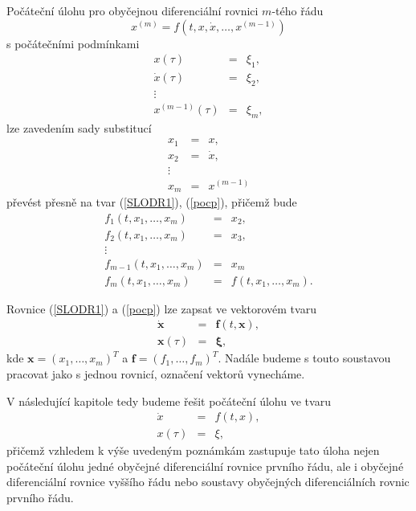 \documentclass[a4paper, 12pt]{book}
\theoremstyle{definition}
\def\vc#1{\mathbf{\boldsymbol{#1}}}     %
\begin{document}
Počáteční úlohu pro obyčejnou diferenciální rovnici $m$-tého řádu
\begin{equation}\label{LODRm}
x^{(m)}=f(t,x,\dot x,\dots,x^{(m-1)})
\end{equation}
s počátečními podmínkami
\begin{equation}\label{pocpm}
\begin{array}{rcl}
x(\tau)&=&\xi_1,\\
\dot x(\tau)&=&\xi_2,\\
\vdots\\
x^{(m-1)}(\tau)&=&\xi_m,
\end{array}
\end{equation}
lze zavedením sady substitucí
\begin{displaymath}
\begin{array}{rcl}
x_1&=&x,\\
x_2&=&\dot x,\\
\vdots\\
x_m&=&x^{(m-1)}
\end{array}
\end{displaymath}
převést přesně na tvar (\ref{SLODR1}), (\ref{pocp}), přičemž bude
\begin{displaymath}
\begin{array}{rcl}
f_1(t,x_1,\dots,x_m)&=&x_2,\\
f_2(t,x_1,\dots,x_m)&=&x_3,\\
\vdots\\
f_{m-1}(t,x_1,\dots,x_m)&=&x_m\\
f_m(t,x_1,\dots,x_m)&=&f(t,x_1,\dots,x_m).
\end{array}
\end{displaymath}

Rovnice (\ref{SLODR1}) a (\ref{pocp}) lze zapsat ve vektorovém tvaru
\begin{eqnarray*}
\dot{\vc x}&=&\vc f(t,\vc x),\\
\vc x(\tau)&=&\vc \xi,
\end{eqnarray*}
kde $\vc x=(x_1,\dots,x_m)^T$ a $\vc f=(f_1,\dots,f_m)^T$. Nadále budeme 
s touto soustavou pracovat jako s jednou rovnicí, označení vektorů vynecháme.

V následující kapitole tedy budeme řešit počáteční úlohu ve tvaru
\begin{equation}\label{pocul}
\begin{array}{crl}
\dot x&=&f(t,x),\\
x(\tau)&=&\xi,
\end{array}
\end{equation}
přičemž vzhledem k výše uvedeným poznámkám zastupuje tato úloha
nejen počáteční úlohu jedné obyčejné diferenciální rovnice 
prvního řádu, ale i obyčejné diferenciální rovnice vyššího řádu
nebo soustavy obyčejných diferenciálních rovnic prvního řádu.
\end{document}
